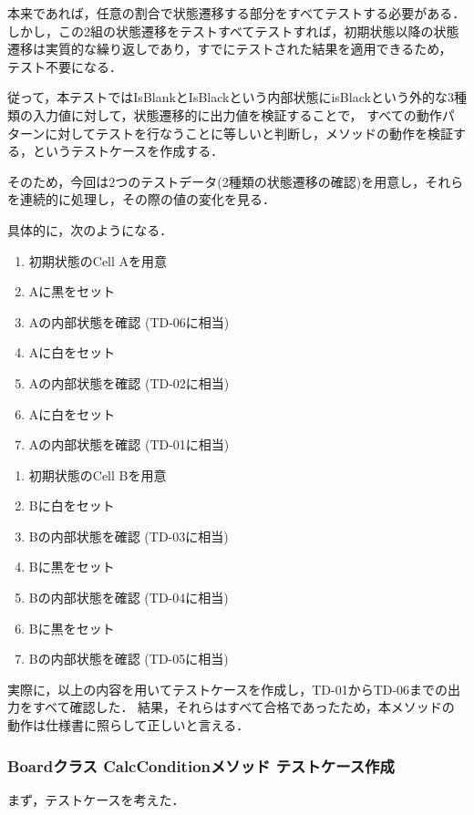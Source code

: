 \documentclass[platex,dvipdfmx,12pt]{jsarticle}
\begin{document}
本来であれば，任意の割合で状態遷移する部分をすべてテストする必要がある．
しかし，この2組の状態遷移をテストすべてテストすれば，初期状態以降の状態遷移は実質的な繰り返しであり，すでにテストされた結果を適用できるため，
テスト不要になる．

従って，本テストではIsBlankとIsBlackという内部状態にisBlackという外的な3種類の入力値に対して，状態遷移的に出力値を検証することで，
すべての動作パターンに対してテストを行なうことに等しいと判断し，メソッドの動作を検証する，というテストケースを作成する．

そのため，今回は2つのテストデータ(2種類の状態遷移の確認)を用意し，それらを連続的に処理し，その際の値の変化を見る．

具体的に，次のようになる．

\begin{enumerate}
  \item 初期状態のCell Aを用意
  \item Aに黒をセット
  \item Aの内部状態を確認 (TD-06に相当)
  \item Aに白をセット
  \item Aの内部状態を確認 (TD-02に相当)
  \item Aに白をセット
  \item Aの内部状態を確認 (TD-01に相当)
\end{enumerate}

\begin{enumerate}
  \item 初期状態のCell Bを用意
  \item Bに白をセット
  \item Bの内部状態を確認 (TD-03に相当)
  \item Bに黒をセット
  \item Bの内部状態を確認 (TD-04に相当)
  \item Bに黒をセット
  \item Bの内部状態を確認 (TD-05に相当)
\end{enumerate}

実際に，以上の内容を用いてテストケースを作成し，TD-01からTD-06までの出力をすべて確認した．
結果，それらはすべて合格であったため，本メソッドの動作は仕様書に照らして正しいと言える．


\subsubsection{Boardクラス CalcConditionメソッド テストケース作成}
まず，テストケースを考えた．
\end{document}
